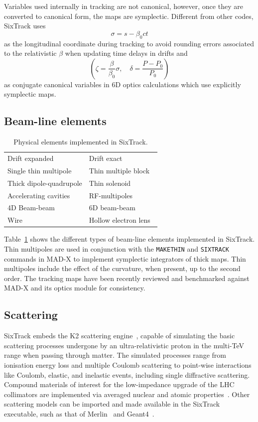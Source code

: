 \documentclass{ws-ijmpa}
\begin{document}
Variables used internally in tracking are not canonical, however, once they are converted to canonical form, the maps are symplectic.
Different from other codes, SixTrack uses
\[
\sigma=s - \beta_0 c t
\]
as the longitudinal coordinate during tracking to avoid rounding errors associated to the relativistic $\beta$ when updating time delays in drifts and
\[
\left(\zeta=\frac{\beta}{\beta_0} \sigma, \quad \delta=\frac{P-P_0}{P_0}\right)
\]
as conjugate canonical variables in 6D optics calculations which use explicitly symplectic maps.


\subsection{Beam-line elements}

\begin{table}[ht]
    \centering
    \begin{tabular}{l|l}
        \hline
         Drift expanded & Drift exact~\cite{fjellstrom13} \\
         Single thin multipole &  Thin multiple block \\
         Thick dipole-quadrupole & Thin solenoid \\
         Accelerating cavities &  RF-multipoles~\cite{rf_multipoles}\\
         4D Beam-beam & 6D beam-beam~\cite{beam_beam}\\
         Wire~\cite{wire3} & Hollow electron lens~\cite{elens,elens3}\\
         \hline
    \end{tabular}
    \caption{Physical elements implemented in SixTrack.}
    \label{tab:tracking_elements}
\end{table}

Table~\ref{tab:tracking_elements} shows the different types of beam-line elements implemented in SixTrack. Thin multipoles are used in conjunction with the \texttt{MAKETHIN} and \texttt{SIXTRACK}  commands in MAD-X to implement symplectic integrators of thick maps.
Thin multipoles include the effect of the curvature, when present, up to the second order. The tracking maps have been recently reviewed and benchmarked against MAD-X and its optics module for consistency.

\subsection{Scattering}
SixTrack embeds the K2 scattering engine~\cite{K2,CTambascoThesis}, capable of simulating the basic scattering processes undergone by an ultra-relativistic proton in the multi-TeV range when passing through matter. The simulated processes range from ionisation energy loss and multiple Coulomb scattering to point-wise interactions like Coulomb, elastic, and inelastic events, including single diffractive scattering. Compound materials of interest for the low-impedance upgrade of the LHC collimators are implemented via averaged nuclear and atomic properties~\cite{EQuarantaThesis}. Other scattering models can be imported and made available in the SixTrack executable, such as  that of Merlin~\cite{merlin} and Geant4~\cite{geant4, MolsonIPAC17}.
\end{document}
